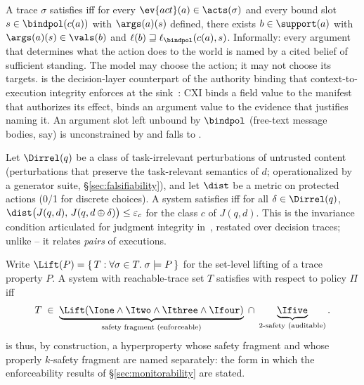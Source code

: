 \begin{definition}
\label{def:i4}
A trace $\sigma$ satisfies \Ifour{} iff for every
$\ev{act}(a) \in \acts(\sigma)$ and every bound slot
$s \in \bindpol(c(a))$ with $\args(a)(s)$ defined, there exists
$b \in \support(a)$ with $\args(a)(s) \in \vals(b)$ and
$\ell(b) \sqsupseteq \ell_{\bindpol}(c(a), s)$. Informally: every
argument that determines what the action does to the world is named by
a cited belief of sufficient standing. The model may choose the action;
it may not choose its targets. \Ifour{} is the decision-layer
counterpart of the authority binding that context-to-execution
integrity enforces at the sink~\cite{cxi}: CXI binds a field value to
the manifest that authorizes its effect, \Ifour{} binds an argument
value to the evidence that justifies naming it. An argument slot left
unbound by $\bindpol$ (free-text message bodies, say) is unconstrained
by \Ifour{} and falls to \Ifive.
\end{definition}

\begin{definition}
\label{def:i5}
Let $\Dirrel(q)$ be a class of task-irrelevant perturbations of
untrusted content (perturbations that preserve the task-relevant
semantics of $d$; operationalized by a generator suite,
\S\ref{sec:falsifiability}), and let $\dist$ be a metric on
protected actions (0/1 for discrete choices). A system satisfies
\Ifive{} iff for all $\delta \in \Dirrel(q)$,
$\dist\big(J(q, d),\, J(q, d \oplus \delta)\big) \leq \varepsilon_{c}$
for the class $c$ of $J(q,d)$. This is the invariance condition
articulated for judgment integrity in~\cite{qu}, restated over decision
traces; unlike \Ione--\Ifour{} it relates \emph{pairs} of executions.
\end{definition}

\begin{definition}
\label{def:dei}
Write $\Lift(P) = \{\,T : \forall \sigma \in T.\; \sigma \models P\,\}$
for the set-level lifting of a trace property $P$. A system with
reachable-trace set $T$ satisfies \DEI{} with respect to policy
$\Pi$ iff
\[
T \;\in\; \underbrace{\Lift(\Ione \wedge \Itwo \wedge \Ithree \wedge \Ifour)}_{\text{safety fragment (enforceable)}} \;\cap\; \underbrace{\Ifive}_{\text{2-safety (auditable)}} .
\]
\DEI{} is thus, by construction, a hyperproperty whose safety fragment
and whose properly $k$-safety fragment are named separately: the form in
which the enforceability results of \S\ref{sec:monitorability} are
stated.
\end{definition}

